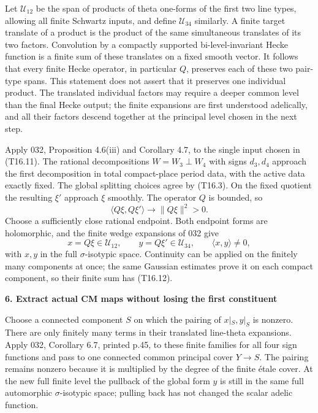 \documentclass[11pt,a4paper]{article}
\theoremstyle{definition}
\begin{document}
Let \(\mathcal U_{12}\) be the span of products of theta one-forms of the first two line types, allowing all finite Schwartz inputs, and define \(\mathcal U_{34}\) similarly. A finite target translate of a product is the product of the same simultaneous translates of its two factors. Convolution by a compactly supported bi-level-invariant Hecke function is a finite sum of these translates on a fixed smooth vector. It follows that every finite Hecke operator, in particular \(Q\), preserves each of these two pair-type spans. This statement does not assert that it preserves one individual product. The translated individual factors may require a deeper common level than the final Hecke output; the finite expansions are first understood adelically, and all their factors descend together at the principal level chosen in the next step.

Apply 032, Proposition 4.6(iii) and Corollary 4.7, to the single input chosen in (T16.11). The rational decompositions \(W=W_3\perp W_4\) with signs \(d_3,d_4\) approach the first decomposition in total compact-place period data, with the active data exactly fixed. The global splitting choices agree by (T16.3). On the fixed quotient the resulting \(\xi'\) approach \(\xi\) smoothly. The operator \(Q\) is bounded, so \[
\langle Q\xi,Q\xi'\rangle\longrightarrow\|Q\xi\|^2>0.
\tag{T16.12}
\] Choose a sufficiently close rational endpoint. Both endpoint forms are holomorphic, and the finite wedge expansions of 032 give \[
x=Q\xi\in\mathcal U_{12},\qquad
y=Q\xi'\in\mathcal U_{34},\qquad
\langle x,y\rangle\ne0,
\tag{T16.13}
\] with \(x,y\) in the full \(\sigma\)-isotypic space. Continuity can be applied on the finitely many components at once; the same Gaussian estimates prove it on each compact component, so their finite sum has (T16.12).

\textbf{6. Extract actual CM maps without losing the first constituent}

Choose a connected component \(S\) on which the pairing of \(x|_S,y|_S\) is nonzero. There are only finitely many terms in their translated line-theta expansions. Apply 032, Corollary 6.7, printed p.45, to these finite families for all four sign functions and pass to one connected common principal cover \(Y\to S\). The pairing remains nonzero because it is multiplied by the degree of the finite étale cover. At the new full finite level the pullback of the global form \(y\) is still in the same full automorphic \(\sigma\)-isotypic space; pulling back has not changed the scalar adelic function.
\end{document}
